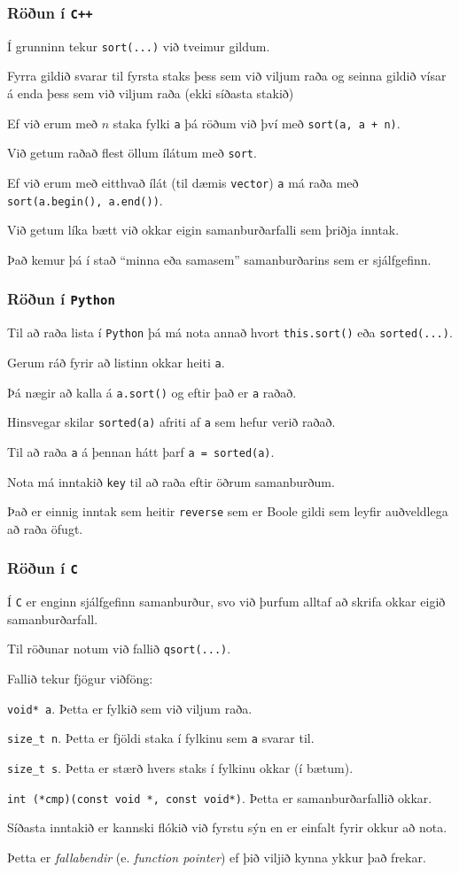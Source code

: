 {
	\frametitle{Röðun í \texttt{C++}}
	{
		\item<1-> Í grunninn tekur \texttt{sort(...)} við tveimur gildum.
		\item<2-> Fyrra gildið svarar til fyrsta staks þess sem við viljum raða og seinna gildið vísar á enda þess sem við viljum raða
			(ekki síðasta stakið)
		\item<3-> Ef við erum með $n$ staka fylki \texttt{a} þá röðum við því með \texttt{sort(a, a + n)}.
		\item<4-> Við getum raðað flest öllum ílátum með \texttt{sort}.
		\item<5-> Ef við erum með eitthvað ílát (til dæmis \texttt{vector}) \texttt{a} má raða með \texttt{sort(a.begin(), a.end())}.
		\item<6-> Við getum líka bætt við okkar eigin samanburðarfalli sem þriðja inntak.
		\item<7-> Það kemur þá í stað ``minna eða samasem'' samanburðarins sem er sjálfgefinn.
	}
}

{
	\frametitle{Röðun í \texttt{Python}}
	{
		\item<1-> Til að raða lista í \texttt{Python} þá má nota annað hvort \texttt{this.sort()} eða \texttt{sorted(...)}.
		\item<2-> Gerum ráð fyrir að listinn okkar heiti \texttt{a}.
		\item<3-> Þá nægir að kalla á \texttt{a.sort()} og eftir það er \texttt{a} raðað.
		\item<4-> Hinsvegar skilar \texttt{sorted(a)} afriti af \texttt{a} sem hefur verið raðað.
		\item<5-> Til að raða \texttt{a} á þennan hátt þarf \texttt{a = sorted(a)}.
		\item<6-> Nota má inntakið \texttt{key} til að raða eftir öðrum samanburðum.
		\item<7-> Það er einnig inntak sem heitir \texttt{reverse} sem er Boole gildi sem leyfir auðveldlega að raða öfugt.
	}
}

{
	\frametitle{Röðun í \texttt{C}}
	{
		\item<1-> Í \texttt{C} er enginn sjálfgefinn samanburður, svo við þurfum alltaf að skrifa okkar eigið samanburðarfall.
		\item<2-> Til röðunar notum við fallið \texttt{qsort(...)}.
		\item<3-> Fallið tekur fjögur viðföng:
		{
			\item<4-> \texttt{void* a}. Þetta er fylkið sem við viljum raða.
			\item<5-> \texttt{size\_t n}. Þetta er fjöldi staka í fylkinu sem \texttt{a} svarar til.
			\item<6-> \texttt{size\_t s}. Þetta er stærð hvers staks í fylkinu okkar (í bætum).
			\item<7-> \texttt{int (*cmp)(const void *, const void*)}. Þetta er samanburðarfallið okkar.
		}
		\item<8-> Síðasta inntakið er kannski flókið við fyrstu sýn en er einfalt fyrir okkur að nota.
		\item<9-> Þetta er \emph{fallabendir} (e. \emph{function pointer}) ef þið viljið kynna ykkur það frekar.
	}
}


